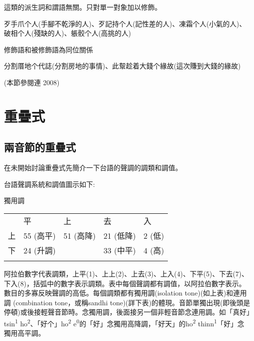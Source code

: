 \textrm{這類的派生詞和謂語無關。只對單一對象加以修飾。}

\textrm{歹手爪个人(手腳不乾淨的人)}、\textrm{歹記持个人(記性差的人)}、\textrm{凍霜个人(小氣的人)}、\textrm{破相个人(殘缺的人)}、\textrm{躼骹个人(高挑的人)}

\begin{listWWviiiNumxivleveli}
\item \begin{styleqwerty}\rmfamily
修飾語和被修飾語為同位關係
\end{styleqwerty}
\end{listWWviiiNumxivleveli}

\textrm{分割厝地个代誌(分割房地的事情)}、\textrm{此幚趁着大錢个緣故(這次賺到大錢的緣故)}

\rmfamily
(本節參閱連 2008)

\section{\rmfamily 重疊式}
\subsection{\rmfamily 兩音節的重疊式}

\textrm{在未開始討論重疊式先簡介一下台語的聲調的調類和調值。}

\rmfamily
台語聲調系統和調值圖示如下:

獨用調

\tablefirsthead{}

\tabletail{}
\tablelasttail{}
\begin{tabularx}{\textwidth}{XXXXX} & 平 & 上 & 去 & 入\\
\lsptoprule
上 & 55 (高平) & 51 (高降) & 21 (低降) & 2 (低)\\
下 & 24 (升調) &  & 33 (中平) & 4 (高)\\
\lspbottomrule
\end{tabularx}
\textrm{阿拉伯數字代表調類，上平(1)}、\textrm{上上(2)}、\textrm{上去(3)}、\textrm{上入(4)}、\textrm{下平(5)}、\textrm{下去(7)}、\textrm{下入(8)}，\textrm{括弧中的數字表示調類。表中每個聲調都有調值，以阿拉伯數字表示。數目的多寡反映聲調的高低。每個調類都有獨用調(isolation tone)(如上表)和連用調 (combination tone，或稱sandhi tone)(詳下表)的體現。音節單獨出現(即後頭是停頓)或後接輕聲音節時。念獨用調，後面接另一個非輕音節念連用調。如「真好」tsin}\textrm{\textsuperscript{1}} \textrm{ho}\textrm{\textsuperscript{2}}、\textrm{「好个」ho}\textrm{\textsuperscript{2}} \textrm{e}\textrm{\textsuperscript{0}}\textrm{的「好」念獨用高降調，「好天」的ho}\textrm{\textsuperscript{2}} \textrm{thinn}\textrm{\textsuperscript{1}}\textrm{「好」念獨用高平調。}

